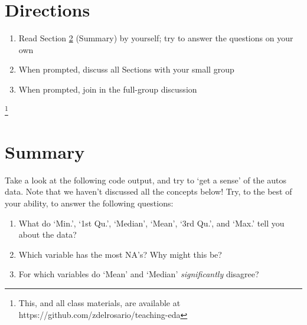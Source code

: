 \documentclass{article}
\newcommand\blfootnote[1]{%
  \begingroup
  \renewcommand\thefootnote{}\footnote{#1}%
  \addtocounter{footnote}{-1}%
  \endgroup
}
\begin{document}
\section{Directions}
\begin{enumerate}
\item Read Section \ref{sec:summary} (Summary) by yourself; try to answer the
  questions on your own
\item When prompted, discuss all Sections with your small group
\item When prompted, join in the full-group discussion
\end{enumerate}

\blfootnote{This, and all class materials, are available at
  https://github.com/zdelrosario/teaching-eda}

\section{Summary} \label{sec:summary}
Take a look at the following code output, and try to `get a sense' of the autos
data. Note that we haven't discussed all the concepts below! Try, to the best of
your ability, to answer the following questions:

\begin{enumerate}
\item What do `Min.', `1st Qu.', `Median', `Mean', `3rd Qu.', and `Max.' tell
  you about the data?
\item Which variable has the most NA's? Why might this be?
\item For which variables do `Mean' and `Median' \emph{significantly} disagree?
\end{enumerate}
\end{document}
